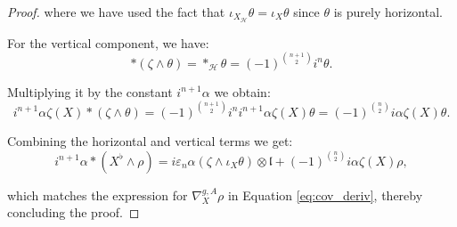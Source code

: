 \documentclass[10pt,a4paper]{amsart}
\begin{document}
\begin{proof}
\noindent
where we have used the fact that $\iota_{X_{\mathcal{H}}}\theta = \iota_{X}\theta$ since $\theta$ is purely horizontal.\medskip

For the vertical component, we have:
\begin{equation*}
*(\zeta\wedge\theta)=*_{\mathcal{H}}\theta=(-1)^{\binom{n+1}{2}}i^n\theta.
\end{equation*}

\noindent
Multiplying it by the constant $i^{n+1}\alpha$ we obtain:
\begin{equation*}
i^{n+1}\alpha\zeta(X)*(\zeta\wedge\theta)=(-1)^{\binom{n+1}{2}}i^ni^{n+1}\alpha\zeta(X)\theta=(-1)^{\binom{n}{2}}i\alpha\zeta(X)\theta.
\end{equation*}

\noindent
Combining the horizontal and vertical terms we get:
\begin{equation*}
i^{n+1}\alpha *(X^{\flat} \wedge \rho) = i\varepsilon_n\alpha(\zeta \wedge \iota_{X}\theta) \otimes \mathfrak{l} + (-1)^{\binom{n}{2}}i\alpha\zeta(X)\rho,
\end{equation*}

\noindent
which matches the expression for $\nabla_{X}^{g,A}\rho$ in Equation \eqref{eq:cov_deriv}, thereby concluding the proof.
\end{proof}
\end{document}
